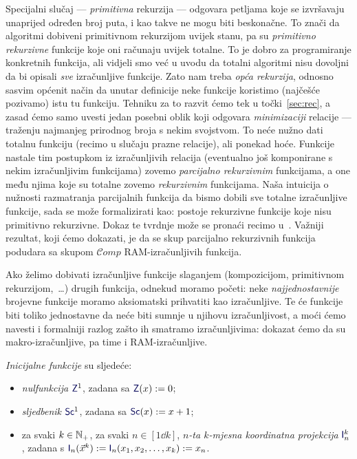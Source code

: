 Specijalni slučaj --- \emph{primitivna} rekurzija --- odgovara petljama koje se izvršavaju unaprijed određen broj puta, i kao takve ne mogu biti beskonačne. To znači da algoritmi dobiveni primitivnom rekurzijom uvijek stanu, pa su \emph{primitivno rekurzivne} funkcije koje oni računaju uvijek totalne. To je dobro za programiranje konkretnih funkcija, ali vidjeli smo već u uvodu da totalni algoritmi nisu dovoljni da bi opisali \emph{sve} izračunljive funkcije. Zato nam treba \emph{opća rekurzija}, odnosno sasvim općenit način da unutar definicije neke funkcije koristimo (najčešće pozivamo) istu tu funkciju. Tehniku za to razvit ćemo tek u točki~\ref{sec:rec}, a zasad ćemo samo uvesti jedan posebni oblik koji odgovara \emph{minimizaciji} relacije --- traženju najmanjeg prirodnog broja s nekim svojstvom. To neće nužno dati totalnu funkciju (recimo u slučaju prazne relacije), ali ponekad hoće. Funkcije nastale tim postupkom iz izračunljivih relacija (eventualno još komponirane s nekim izračunljivim funkcijama) zovemo \emph{parcijalno rekurzivnim} funkcijama, a one među njima koje su totalne zovemo \emph{rekurzivnim} funkcijama. Naša intuicija o nužnosti razmatranja parcijalnih funkcija da bismo dobili sve totalne izračunljive funkcije, sada se može formalizirati kao: postoje rekurzivne funkcije koje nisu primitivno rekurzivne. Dokaz te tvrdnje može se pronaći recimo u~\cite[dodatak]{skr:Vuk}. Važniji rezultat, koji ćemo dokazati, je da se skup parcijalno rekurzivnih funkcija podudara sa skupom $\mathscr Comp$ RAM-izračunljivih funkcija.


Ako želimo dobivati izračunljive funkcije slaganjem (kompozicijom, primitivnom rekurzijom,~\ldots) drugih funkcija, odnekud moramo početi: neke \emph{najjednostavnije} brojevne funkcije moramo aksiomatski prihvatiti kao izračunljive. Te će funkcije biti toliko jednostavne da neće biti sumnje u njihovu izračunljivost, a moći ćemo navesti i formalniji razlog zašto ih smatramo izračunljivima: dokazat ćemo da su makro-izračunljive, pa time i RAM-izračunljive.

\begin{definicija}[{name=[inicijalne funkcije]}]\label{def:init}
\emph{Inicijalne funkcije} su sljedeće:
\begin{itemize}
    \item \emph{nulfunkcija} $\f Z^1$, zadana sa $\f Z(x):=0$;
    \item \emph{sljedbenik} $\f{Sc}^1$, zadana sa $\f{Sc}(x):=x+1$;
    \item za svaki $k\in{\mathbb N}_+$, za svaki $n\in[1\dd k]$, \emph{$n$-ta $k$-mjesna koordinatna projekcija} $\f I_n^k$, zadana s $\f I_n(\vec x^k):=\f I_n(x_1,x_2,\dotsc,x_k):=x_n$.\qedhere
\end{itemize}
\end{definicija}

